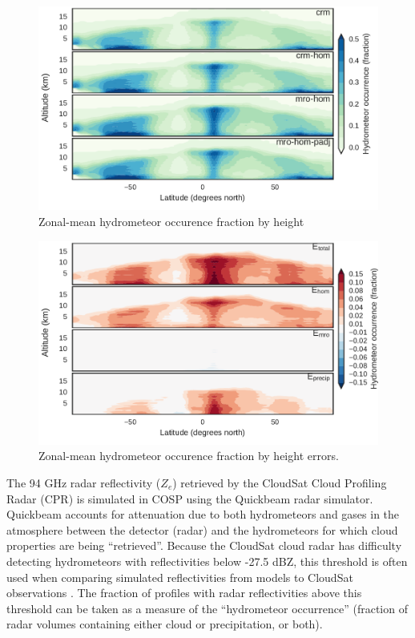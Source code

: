 \begin{figure}[htbp]
\centering
\includegraphics{graphics/subgrid1_hfba_zonal.pdf}
\caption{\label{fig:hfbaZonalMro}Zonal-mean hydrometeor occurence
fraction by height}\label{fig:hfbaZonalMro}
\end{figure}

\begin{figure}[htbp]
\centering
\includegraphics{graphics/subgrid1_hfba_zonal_diff.pdf}
\caption{\label{fig:hfbaZonalMroDiff}Zonal-mean hydrometeor occurence
fraction by height errors.}\label{fig:hfbaZonalMroDiff}
\end{figure}

The 94 GHz radar reflectivity (\(Z_e\)) retrieved by the CloudSat Cloud
Profiling Radar (CPR) is simulated in COSP using the Quickbeam
\citep{haynes_et_al_2007} radar simulator. Quickbeam accounts for
attenuation due to both hydrometeors and gases in the atmosphere between
the detector (radar) and the hydrometeors for which cloud properties are
being ``retrieved''. Because the CloudSat cloud radar has difficulty
detecting hydrometeors with reflectivities below -27.5 dBZ, this
threshold is often used when comparing simulated reflectivities from
models to CloudSat observations \citep{marchand_et_al_2009}. The
fraction of profiles with radar reflectivities above this threshold can
be taken as a measure of the ``hydrometeor occurrence'' (fraction of
radar volumes containing either cloud or precipitation, or both).

